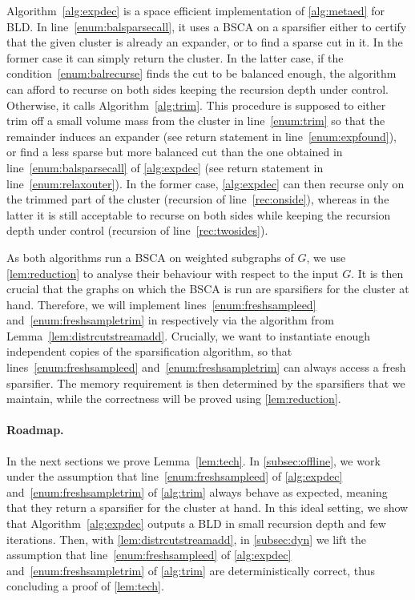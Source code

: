 \documentclass[epsfig,letter,11pt]{article}
\numberwithin{equation}{section}
\begin{document}
Algorithm~\ref{alg:expdec} is a space efficient implementation of \cref{alg:metaed} for BLD. In line~\eqref{enum:balsparsecall}, it uses a BSCA on a sparsifier either to certify that the given cluster is already an expander, or to find a sparse cut in it. In the former case it can simply return the cluster. In the latter case, if the condition~\eqref{enum:balrecurse} finds the cut to be balanced enough, the algorithm can afford to recurse on both sides keeping the recursion depth under control. Otherwise, it calls Algorithm~\ref{alg:trim}. This procedure is supposed to either trim off a small volume mass from the cluster in line~\eqref{enum:trim} so that the remainder induces an expander (see return statement in line~\eqref{enum:expfound}), or find a less sparse but more balanced cut than the one obtained in line~\eqref{enum:balsparsecall} of \cref{alg:expdec} (see return statement in line~\eqref{enum:relaxouter}). In the former case, \cref{alg:expdec} can then recurse only on the trimmed part of the cluster (recursion of line~\eqref{rec:onside}), whereas in the latter it is still acceptable to recurse on both sides while keeping the recursion depth under control (recursion of line~\eqref{rec:twosides}).



As both algorithms run a BSCA on weighted subgraphs of $G$, we use \cref{lem:reduction} to analyse their behaviour with respect to the input $G$. It is then crucial that the graphs on which the BSCA is run are sparsifiers for the cluster at hand. Therefore, we will implement lines~\eqref{enum:freshsampleed} and~\eqref{enum:freshsampletrim}  in  respectively via the algorithm from Lemma~\ref{lem:distrcutstreamadd}. Crucially, we want to instantiate enough independent copies of the sparsification algorithm, so that lines~\eqref{enum:freshsampleed} and~\eqref{enum:freshsampletrim} can always access a fresh sparsifier. The memory requirement is then determined by the sparsifiers that we maintain, while the correctness will be proved using \cref{lem:reduction}.

\paragraph{Roadmap.} In the next sections we prove Lemma~\ref{lem:tech}. In \cref{subsec:offline}, we work under the assumption that  line~\eqref{enum:freshsampleed} of \cref{alg:expdec} and~\eqref{enum:freshsampletrim}  of \cref{alg:trim} always behave as expected, meaning that they return a sparsifier for the cluster at hand. In this ideal setting, we show that Algorithm~\ref{alg:expdec} outputs a BLD in small recursion depth and few iterations. Then, with \cref{lem:distrcutstreamadd}, in \cref{subsec:dyn} we lift the assumption that  line~\eqref{enum:freshsampleed} of \cref{alg:expdec} and~\eqref{enum:freshsampletrim}  of \cref{alg:trim} are deterministically correct, thus concluding a proof of \cref{lem:tech}.
\end{document}
